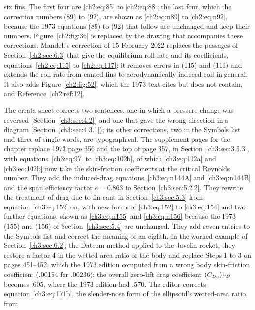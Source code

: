 \begin{description}
    six fins. The first four are \eqref{ch2:eq:85} to \eqref{ch2:eq:88}; the last four, which the
    correction numbers (89) to (92), are shown as \eqref{ch2:eq:n89} to \eqref{ch2:eq:n92}, because
    the 1973 equations (89) to (92) that follow are unchanged and keep their numbers.
    Figure~\ref{ch2:fig:36} is replaced by the drawing that accompanies these corrections.
    Mandell's correction of 15 February 2022 replaces the passages of Section~\ref{ch2:sec:6.3}
    that give the equilibrium roll rate and its coefficients, equations~\eqref{ch2:eq:115} to
    \eqref{ch2:eq:117}: it removes errors in (115) and (116) and extends the roll rate from canted
    fins to aerodynamically induced roll in general. It also adds Figure~\ref{ch2:fig:52}, which
    the 1973 text cites but does not contain, and Reference~\ref{ch2:ref:12}.
  \item[Chapter~\ref{ch3}.] The errata sheet corrects two sentences, one in which a pressure change
    was reversed (Section~\ref{ch3:sec:4.2}) and one that gave the wrong direction in a diagram
    (Section~\ref{ch3:sec:4.3.1}); its other corrections, two in the Symbols list and three of
    single words, are typographical. The supplement pages for the chapter replace 1973 page 356 and
    the top of page 357, in Section~\ref{ch3:sec:3.5.3}, with equations~\eqref{ch3:eq:97} to
    \eqref{ch3:eq:102b}, of which \eqref{ch3:eq:102a} and \eqref{ch3:eq:102b} now take the
    skin-friction coefficients at the critical Reynolds number. They add the induced-drag
    equations~\eqref{ch3:eq:n144A} and \eqref{ch3:eq:n144B} and the span efficiency factor $e = 0.863$ to
    Section~\ref{ch3:sec:5.2.2}. They rewrite the treatment of drag due to fin cant in
    Section~\ref{ch3:sec:5.3} from equation~\eqref{ch3:eq:152} on, with new forms of
    \eqref{ch3:eq:152} to \eqref{ch3:eq:154} and two further equations, shown as
    \eqref{ch3:eq:n155} and \eqref{ch3:eq:n156} because the 1973 (155) and (156) of
    Section~\ref{ch3:sec:5.4} are unchanged. They add seven entries to the Symbols list and correct
    the meaning of an eighth. In the worked example of Section~\ref{ch3:sec:6.2}, the Datcom method
    applied to the Javelin rocket, they restore a factor 4 in the wetted-area ratio of the body and
    replace Steps 1 to 3 on pages 451--452, which the 1973 edition computed from a wrong body
    skin-friction coefficient (.00154 for .00236); the overall zero-lift drag coefficient
    $(C_{D_0})_{FB}$ becomes .605, where the 1973 edition had .570. The editor corrects
    equation~\eqref{ch3:eq:171b}, the slender-nose form of the ellipsoid's wetted-area ratio, from

\end{description}
